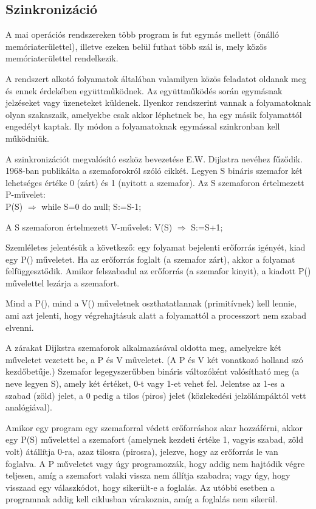 \documentclass[fleqn,10pt,a4paper]{article}
\newcommand{\nn}{\Rightarrow}
\theoremstyle{magyar}
\begin{document}
  \subsection{Szinkronizáció}

  A mai operációs rendszereken több program is fut egymás mellett (önálló memóriaterülettel),
  illetve ezeken belül futhat több szál is, mely közös memóriaterülettel rendelkezik.

  A rendszert alkotó folyamatok általában valamilyen közös feladatot oldanak meg és ennek érdekében együttműködnek. Az
  együttműködés során egymásnak jelzéseket vagy üzeneteket küldenek. Ilyenkor rendszerint vannak a folyamatoknak olyan
  szakaszaik, amelyekbe csak akkor léphetnek be, ha egy másik folyamattól engedélyt kaptak. Ily módon a folyamatoknak
  egymással szinkronban kell működniük.

  A szinkronizációt megvalósító eszköz bevezetése E.W. Dijkstra nevéhez fűződik. 1968-ban publikálta a szemaforokról szóló cikkét. 
  Legyen S bináris szemafor két lehetséges értéke 0 (zárt) és 1 (nyitott a szemafor). Az S szemaforon értelmezett P-művelet:\\
  P(S) $\nn$ while S=0 do null; S:=S-1; 

  A S szemaforon értelmezett V-művelet: V(S) $\nn$ S:=S+1; 

  Szemléletes jelentésük a következő: egy folyamat bejelenti erőforrás igényét, kiad egy P() műveletet. Ha az erőforrás
  foglalt (a szemafor zárt), akkor a folyamat felfüggesztődik. Amikor felszabadul az erőforrás (a szemafor kinyit), a
  kiadott P() művelettel lezárja a szemafort.

  Mind a P(), mind a V() műveletnek oszthatatlannak (primitívnek) kell lennie, ami azt jelenti, hogy végrehajtásuk alatt
  a folyamattól a processzort nem szabad elvenni.
  

  A zárakat Dijkstra szemaforok alkalmazásával oldotta meg, amelyekre két műveletet vezetett be, a P és V műveletet. (A
  P és V két vonatkozó holland szó kezdőbetűje.) Szemafor legegyszerűbben bináris változóként valósítható meg (a neve
  legyen S), amely két értéket, 0-t vagy 1-et vehet fel. Jelentse az 1-es a szabad (zöld) jelet, a 0 pedig a tilos
  (piros) jelet (közlekedési jelzőlámpáktól vett analógiával). 

  Amikor egy program egy szemaforral védett erőforráshoz akar hozzáférni, akkor egy P(S) művelettel a szemafort
  (amelynek kezdeti értéke 1, vagyis szabad, zöld volt) átállítja 0-ra, azaz tilosra (pirosra), jelezve, hogy az
  erőforrás le van foglalva. A P műveletet vagy úgy programozzák, hogy addig nem hajtódik végre teljesen, amíg a
  szemafort valaki vissza nem állítja szabadra; vagy úgy, hogy visszaad egy válaszkódot, hogy sikerült-e a foglalás. Az
  utóbbi esetben a programnak addig kell ciklusban várakoznia, amíg a foglalás nem sikerül. 
\end{document}
